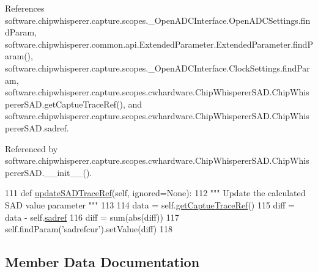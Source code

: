 References software.\+chipwhisperer.\+capture.\+scopes.\+\_\+\+Open\+A\+D\+C\+Interface.\+Open\+A\+D\+C\+Settings.\+find\+Param, software.\+chipwhisperer.\+common.\+api.\+Extended\+Parameter.\+Extended\+Parameter.\+find\+Param(), software.\+chipwhisperer.\+capture.\+scopes.\+\_\+\+Open\+A\+D\+C\+Interface.\+Clock\+Settings.\+find\+Param, software.\+chipwhisperer.\+capture.\+scopes.\+cwhardware.\+Chip\+Whisperer\+S\+A\+D.\+Chip\+Whisperer\+S\+A\+D.\+get\+Captue\+Trace\+Ref(), and software.\+chipwhisperer.\+capture.\+scopes.\+cwhardware.\+Chip\+Whisperer\+S\+A\+D.\+Chip\+Whisperer\+S\+A\+D.\+sadref.



Referenced by software.\+chipwhisperer.\+capture.\+scopes.\+cwhardware.\+Chip\+Whisperer\+S\+A\+D.\+Chip\+Whisperer\+S\+A\+D.\+\_\+\+\_\+init\+\_\+\+\_\+().


\begin{DoxyCode}
111     \textcolor{keyword}{def }\hyperlink{classsoftware_1_1chipwhisperer_1_1capture_1_1scopes_1_1cwhardware_1_1ChipWhispererSAD_1_1ChipWhispererSAD_a872860464c98eb51d9b7ecaed920a475}{updateSADTraceRef}(self, ignored=None):
112         \textcolor{stringliteral}{""" Update the calculated SAD value parameter """}
113 
114         data = self.\hyperlink{classsoftware_1_1chipwhisperer_1_1capture_1_1scopes_1_1cwhardware_1_1ChipWhispererSAD_1_1ChipWhispererSAD_aecf66131adfea48aa5470a299bd3bef3}{getCaptueTraceRef}()
115         diff = data - self.\hyperlink{classsoftware_1_1chipwhisperer_1_1capture_1_1scopes_1_1cwhardware_1_1ChipWhispererSAD_1_1ChipWhispererSAD_a7eb7ada127e148e76f41e602a511510e}{sadref}
116         diff = sum(abs(diff))
117         self.findParam(\textcolor{stringliteral}{'sadrefcur'}).setValue(diff)
118 
\end{DoxyCode}


\subsection{Member Data Documentation}
\hypertarget{classsoftware_1_1chipwhisperer_1_1capture_1_1scopes_1_1cwhardware_1_1ChipWhispererSAD_1_1ChipWhispererSAD_a3544050360814da040141bfe7a63a772}{}
